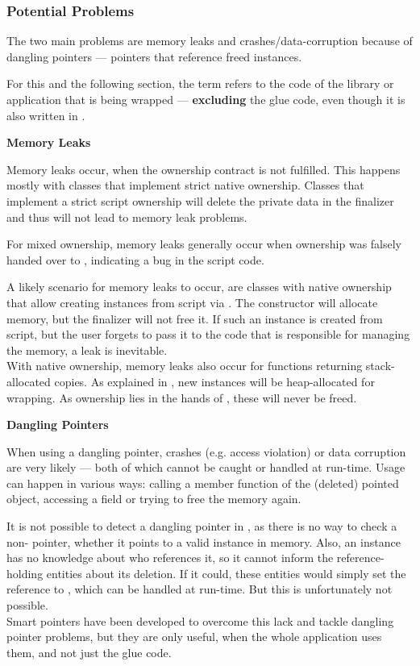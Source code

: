 \subsubsection{Potential Problems}

The two main problems are memory leaks and crashes/data-corruption because of \linebreak dangling pointers --- pointers that reference freed instances.

For this and the following section, the term  refers to the code of the library or application that is being wrapped --- \textbf{excluding} the glue code, even though it is also written in .

\textbf{Memory Leaks}

Memory leaks occur, when the ownership contract is not fulfilled. This happens mostly with classes that implement strict native ownership. Classes that implement a strict script ownership will delete the private data in the finalizer and thus will not lead to memory leak problems.

For mixed ownership, memory leaks generally occur when ownership was falsely handed over to , indicating a bug in the script code.

A likely scenario for memory leaks to occur, are classes with native ownership that allow creating instances from script via . The constructor will allocate memory, but the finalizer will not free it. If such an instance is created from script, but the user forgets to pass it to the  code that is responsible for managing the memory, a leak is inevitable.\\
With native ownership, memory leaks also occur for functions returning stack-allocated copies. As explained in , new instances will be heap-allocated for wrapping. As ownership lies in the hands of , these will never be freed.

\textbf{Dangling Pointers}

When using a dangling pointer, crashes (e.g. access violation) or data corruption are very likely --- both of which cannot be caught or handled at run-time. Usage can happen in various ways: calling a member function of the (deleted) pointed object, accessing a field or trying to free the memory again.

It is not possible to detect a dangling pointer in , as there is no way to check a non- pointer, whether it points to a valid instance in memory. Also, an instance has no knowledge about who references it, so it cannot inform the reference-holding entities about its deletion. If it could, these entities would simply set the reference to , which can be handled at run-time. But this is unfortunately not possible.\\
Smart pointers have been developed to overcome this lack and tackle dangling pointer problems, but they are only useful, when the whole application uses them, and not just the glue code.

